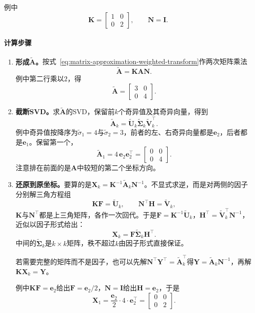 例中
\[
 \bm K=\begin{bmatrix}1&0\\0&2\end{bmatrix},\qquad \bm N=\bm I .
\]

\paragraph{计算步骤}
\begin{enumerate}
 \item \textbf{形成$\widetilde{\bm A}$。}按式~\eqref{eq:matrix-approximation-weighted-transform}作两次矩阵乘法
 \[
  \widetilde{\bm A}=\bm K\bm A\bm N .
 \]
 例中第二行乘以$2$，得
 \[
  \widetilde{\bm A}=\begin{bmatrix}3&0\\0&4\end{bmatrix}.
 \]

 \item \textbf{截断SVD。}求$\widetilde{\bm A}$的SVD，保留前$k$个奇异值及其奇异向量，得到
 \[
  \widetilde{\bm A}_k=\widetilde{\bm U}_k\widetilde{\bm\Sigma}_k\widetilde{\bm V}_k^\top .
 \]
 例中奇异值按降序为$\tilde\sigma_1=4$与$\tilde\sigma_2=3$，前者的左、右奇异向量都是$\bm e_2$，后者都是$\bm e_1$。保留第一个，
 \[
  \widetilde{\bm A}_1=4\,\bm e_2\bm e_2^\top=\begin{bmatrix}0&0\\0&4\end{bmatrix}.
 \]
 注意排在前面的是$\bm A$中较短的第二个坐标方向。

 \item \textbf{还原到原坐标。}要算的是$\bm X_k=\bm K^{-1}\widetilde{\bm A}_k\bm N^{-1}$。不显式求逆，而是对两侧的因子分别解三角方程组
 \begin{equation}
  \bm K\bm F=\widetilde{\bm U}_k,\qquad \bm N^\top\bm H=\widetilde{\bm V}_k ,
  \label{eq:matrix-approximation-weighted-recover-factors}
 \end{equation}
 $\bm K$与$\bm N^\top$都是上三角矩阵，各作一次回代。于是$\bm F=\bm K^{-1}\widetilde{\bm U}_k$，$\bm H^\top=\widetilde{\bm V}_k^\top\bm N^{-1}$，近似以因子形式给出：
 \[
  \bm X_k=\bm F\widetilde{\bm\Sigma}_k\bm H^\top .
 \]
 中间的$\widetilde{\bm\Sigma}_k$是$k\times k$矩阵，秩不超过$k$由因子形式直接保证。

 若需要完整的矩阵而不是因子，也可以先解$\bm N^\top\bm Y^\top=\widetilde{\bm A}_k^\top$得$\bm Y=\widetilde{\bm A}_k\bm N^{-1}$，再解$\bm K\bm X_k=\bm Y$。

 例中$\bm K\bm F=\bm e_2$给出$\bm F=\bm e_2/2$，$\bm N=\bm I$给出$\bm H=\bm e_2$，于是
 \[
  \bm X_1=\frac{\bm e_2}{2}\cdot4\cdot\bm e_2^\top=\begin{bmatrix}0&0\\0&2\end{bmatrix}.
 \]


\end{enumerate}
